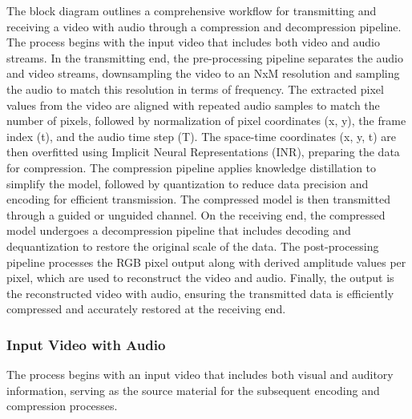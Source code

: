 \documentclass{ioereport}
\begin{document}
        The block diagram outlines a comprehensive workflow for transmitting and receiving a video with audio through a compression and decompression pipeline. The process begins with the input video that includes both video and audio streams. In the transmitting end, the pre-processing pipeline separates the audio and video streams, downsampling the video to an NxM resolution and sampling the audio to match this resolution in terms of frequency. The extracted pixel values from the video are aligned with repeated audio samples to match the number of pixels, followed by normalization of pixel coordinates (x, y), the frame index (t), and the audio time step (T). The space-time coordinates (x, y, t) are then overfitted using Implicit Neural Representations (INR), preparing the data for compression. The compression pipeline applies knowledge distillation to simplify the model, followed by quantization to reduce data precision and encoding for efficient transmission. The compressed model is then transmitted through a guided or unguided channel. On the receiving end, the compressed model undergoes a decompression pipeline that includes decoding and dequantization to restore the original scale of the data. The post-processing pipeline processes the RGB pixel output along with derived amplitude values per pixel, which are used to reconstruct the video and audio. Finally, the output is the reconstructed video with audio, ensuring the transmitted data is efficiently compressed and accurately restored at the receiving end.

        \subsubsection{Input Video with Audio}
        The process begins with an input video that includes both visual and auditory information, serving as the source material for the subsequent encoding and compression processes.
\end{document}
